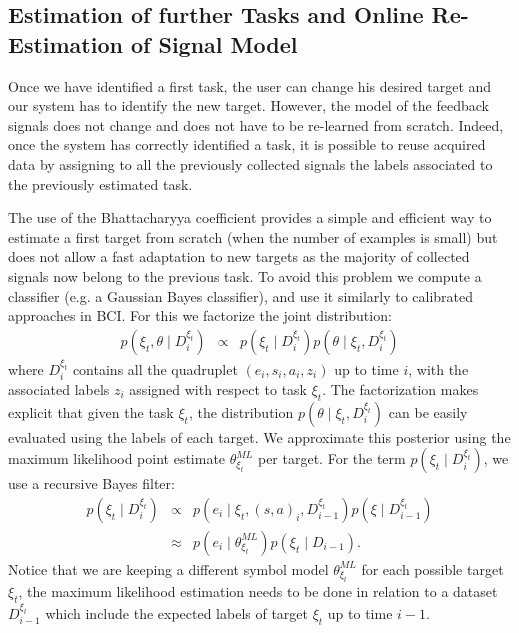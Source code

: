 \subsection{Estimation of further Tasks and Online Re-Estimation of Signal Model}
\label{sec:AlgReUse}

Once we have identified a first task, the user can change his desired target and our system has to identify the new target. However, the model of the feedback signals does not change and does not have to be re-learned from scratch. Indeed, once the system has correctly identified a task, it is possible to reuse acquired data by assigning to all the previously collected signals the labels associated to the previously estimated task. 

The use of the Bhattacharyya coefficient provides a simple and efficient way to estimate a first target from scratch (when the number of examples is small) but does not allow a fast adaptation to new targets as the majority of collected signals now belong to the previous task. To avoid this problem we compute a classifier (e.g. a Gaussian Bayes classifier), and use it similarly to calibrated approaches in BCI. For this we factorize the joint distribution:
%
\begin{eqnarray}
p(\xi_t, \theta \mid D^{\xi_t}_i) & \propto & p(\xi_t \mid D^{\xi_t}_i)p(\theta \mid \xi_t, D^{\xi_t}_i)
\end{eqnarray}
%
where $D^{\xi_t}_i$ contains all the quadruplet $(e_i,s_i,a_i,z_i)$ up to time $i$, with the associated labels $z_i$ assigned with respect to task $\xi_t$. The factorization makes explicit that given the task $\xi_t$, the distribution $p(\theta \mid \xi_t, D^{\xi_t}_i)$ can be easily evaluated using the labels of each target. We approximate this posterior using the maximum likelihood point estimate $\theta^{ML}_{\xi_t}$ per target. For the term $p(\xi_t \mid D^{\xi_t}_i)$, we use a recursive Bayes filter:
%
\begin{eqnarray}
p(\xi_t \mid D^{\xi_t}_i) &\propto & p(e_i \mid \xi_t, (s,a)_i,D^{\xi_t}_{i-1})p(\xi \mid D^{\xi_t}_{i-1}) \nonumber\\
& \approx & p(e_i\mid \theta^{ML}_{\xi_t})p(\xi_t \mid D_{i-1}).
\label{eq:taskprob}
\end{eqnarray}
%
Notice that we are keeping a different symbol model  $\theta^{ML}_{\xi_t}$  for each possible target $\xi_t$, the maximum likelihood estimation needs to be done in relation to a dataset $D^{\xi_t}_{i-1}$ which include the expected labels of target $\xi_t$ up to time $i-1$. 

